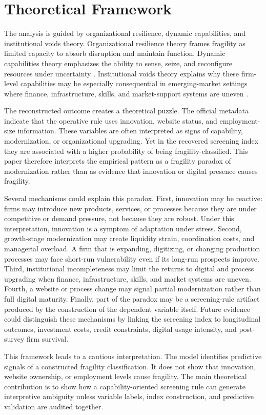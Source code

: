 \section{Theoretical Framework}

The analysis is guided by organizational resilience, dynamic capabilities, and institutional voids theory. Organizational resilience theory frames fragility as limited capacity to absorb disruption and maintain function. Dynamic capabilities theory emphasizes the ability to sense, seize, and reconfigure resources under uncertainty \citep{teece1997dynamic}. Institutional voids theory explains why these firm-level capabilities may be especially consequential in emerging-market settings where finance, infrastructure, skills, and market-support systems are uneven \citep{khanna1997why}.

The reconstructed outcome creates a theoretical puzzle. The official metadata indicate that the operative rule uses innovation, website status, and employment-size information. These variables are often interpreted as signs of capability, modernization, or organizational upgrading. Yet in the recovered screening index they are associated with a higher probability of being fragility-classified. This paper therefore interprets the empirical pattern as a fragility paradox of modernization rather than as evidence that innovation or digital presence causes fragility.

Several mechanisms could explain this paradox. First, innovation may be reactive: firms may introduce new products, services, or processes because they are under competitive or demand pressure, not because they are robust. Under this interpretation, innovation is a symptom of adaptation under stress. Second, growth-stage modernization may create liquidity strain, coordination costs, and managerial overload. A firm that is expanding, digitizing, or changing production processes may face short-run vulnerability even if its long-run prospects improve. Third, institutional incompleteness may limit the returns to digital and process upgrading when finance, infrastructure, skills, and market systems are uneven. Fourth, a website or process change may signal partial modernization rather than full digital maturity. Finally, part of the paradox may be a screening-rule artifact produced by the construction of the dependent variable itself. Future evidence could distinguish these mechanisms by linking the screening index to longitudinal outcomes, investment costs, credit constraints, digital usage intensity, and post-survey firm survival.

This framework leads to a cautious interpretation. The model identifies predictive signals of a constructed fragility classification. It does not show that innovation, website ownership, or employment levels cause fragility. The main theoretical contribution is to show how a capability-oriented screening rule can generate interpretive ambiguity unless variable labels, index construction, and predictive validation are audited together.
